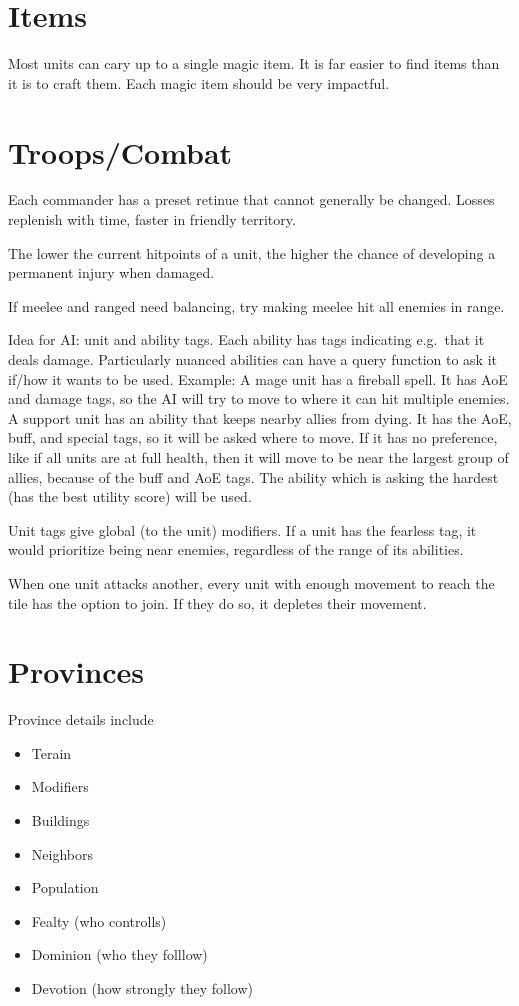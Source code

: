 \documentclass[12pt,letterpaper]{article}
\begin{document}
\section{Items}

Most units can cary up to a single magic item.
It is far easier to find items than it is to craft them.
Each magic item should be very impactful.

\section{Troops/Combat}

Each commander has a preset retinue that cannot generally be changed.
Losses replenish with time, faster in friendly territory.

The lower the current hitpoints of a unit,
the higher the chance of developing a permanent injury when damaged.

If meelee and ranged need balancing, try making meelee hit all enemies in range.

Idea for AI: unit and ability tags.
Each ability has tags indicating e.g.\ that it deals damage.
Particularly nuanced abilities can have a query function to ask it if/how it wants to be used.
Example: A mage unit has a fireball spell.
It has AoE and damage tags, so the AI will try to move to where it can hit multiple enemies.
A support unit has an ability that keeps nearby allies from dying.
It has the AoE, buff, and special tags, so it will be asked where to move.
If it has no preference, like if all units are at full health,
then it will move to be near the largest group of allies,
because of the buff and AoE tags.
The ability which is asking the hardest (has the best utility score) will be used.

Unit tags give global (to the unit) modifiers.
If a unit has the fearless tag, it would prioritize being near enemies,
regardless of the range of its abilities.

When one unit attacks another,
every unit with enough movement to reach the tile has the option to join.
If they do so, it depletes their movement.

\section{Provinces}

Province details include

\begin{itemize}
	\item Terain
	\item Modifiers
	\item Buildings
	\item Neighbors
	\item Population
	\item Fealty (who controlls)
	\item Dominion (who they folllow)
	\item Devotion (how strongly they follow)
\end{itemize}
\end{document}
